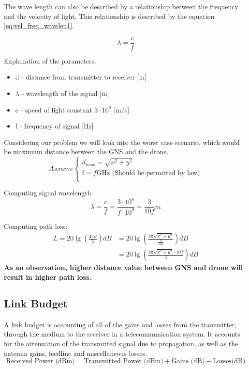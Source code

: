 The wave length can also be described by a relationship between the frequency and the velocity of light. This relationship is described by the equation \ref{eq:vel_freq_wavelen1}.

\begin{equation}\label{eq:vel_freq_wavelen1}
	\lambda = \frac{c}{f}
\end{equation}

Explanation of the parameters.
\begin{itemize}
	\item d - distance from transmitter to receiver [m]
	\item $\lambda$ - wavelength of the signal [m]
	\item c - speed of light constant $3\cdot 10^8$ [m/s] 
	\item f - frequency of signal [Hz]
\end{itemize}

Considering our problem we will look into the worst case scenario, which would be maximum distance between the GNS and the drone. 
\begin{equation*}
	Assume 
	\begin{cases}
	d_{max} = \sqrt{x^2+y^2}\\
	\text{f} = f\text{GHz (Should be permitted by law})\\
	\end{cases}
\end{equation*}

Computing signal wavelength:
\begin{equation}\label{eq:vel_freq_wavelen2}
	\lambda = \frac{c}{f} 
	        = \frac{3\cdot 10^{8}}{f\cdot 10^{9}}
	        = \frac{3}{10f}m
\end{equation}

Computing path loss:
\begin{align*}\label{eq:path_loses_calc}
	L = 20\lg\left (\frac{4\pi d}{\lambda} \right) dB 
	 &= 20\lg\left (\frac{4\pi \sqrt{x^2+y^2}}{\frac{3}{10f}} \right) dB\\ 
	 &= 20\lg\left (\frac{4\pi \sqrt{x^2+y^2}\cdot 10f}{ 3} \right) dB
\end{align*}
\noindent \textbf{As an observation, higher distance value between GNS and drone will result in higher path loss.}

\subsection{Link Budget}\label{subsec:link_budget}
\paragraph{}
A link budget is accounting of all of the gains and losses from the transmitter, through the medium  to the receiver in a telecommunication system. It accounts for the attenuation of the transmitted signal due to propagation, as well as the antenna gains, feedline and miscellaneous losses. 
\begin{equation*}\label{eq:link_budget} 
 		\text{Received Power (dBm)} = \text{Transmitted Power (dBm)} + \text{Gains (dB)} - \text{Losses(dB)}
\end{equation*}

